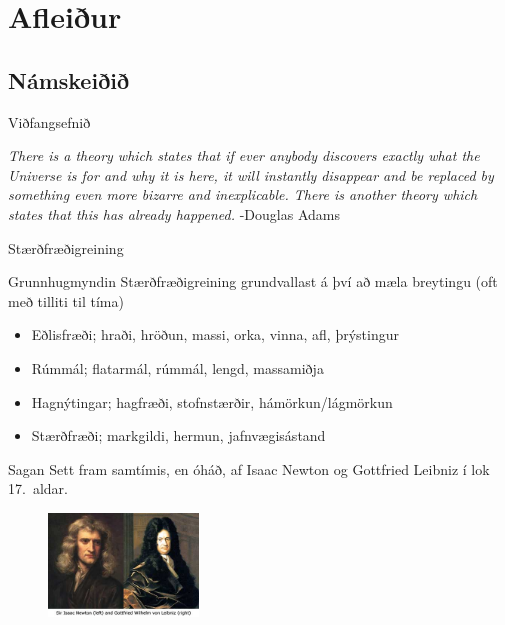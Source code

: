 \documentclass[icelandic,a4paper,12pt]{article}
\date{29. ágúst 2012}
\begin{document}
\begin{frame}
	\maketitle
\end{frame}
\section*{Afleiður}
\subsection*{Námskeiðið}
\begin{frame}{Viðfangsefnið}
 \begin{block}{}
 \emph{There is a theory which states that if ever anybody discovers exactly what the Universe is for and 
  why it is here, it will instantly disappear and be replaced by something even more bizarre and inexplicable. 
  There is another theory which states that this has already happened.} \hfill -Douglas Adams
 \end{block}

\end{frame}

\begin{frame}{Stærðfræðigreining}

\begin{block}{Grunnhugmyndin}
 Stærðfræðigreining grundvallast á því að mæla breytingu (oft með tilliti til tíma)
 \begin{itemize}
  \item Eðlisfræði; hraði, hröðun, massi, orka, vinna, afl, þrýstingur
  \item Rúmmál; flatarmál, rúmmál, lengd, massamiðja
  \item Hagnýtingar; hagfræði, stofnstærðir, hámörkun/lágmörkun 
  \item Stærðfræði; markgildi, hermun, jafnvægisástand
 \end{itemize}
  \end{block}

\pause


\begin{block}{Sagan}
 Sett fram samtímis, en óháð, af Isaac Newton og Gottfried Leibniz í lok 17.~aldar.
\end{block}

\begin{figure}
 \includegraphics[width=4cm]{./myndir/kafli01/01_NewtonLeibniz.jpg}
\end{figure}



\end{frame}
\end{document}
